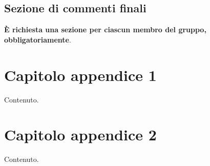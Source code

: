 \documentclass[a4paper,12pt]{report}
\begin{document}
\section{Sezione di commenti finali}

\textbf{È richiesta una sezione per ciascun membro del gruppo, obbligatoriamente}.

\appendix
\chapter{Capitolo appendice 1}

Contenuto.

\chapter{Capitolo appendice 2}

Contenuto.



\end{document}
